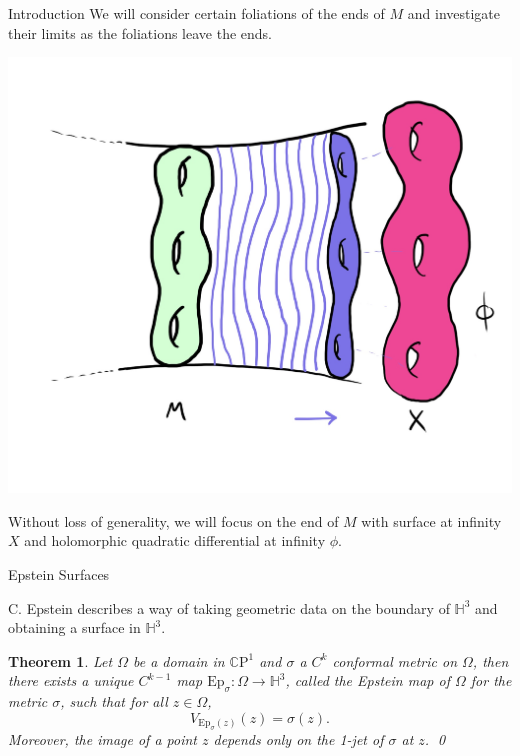 \documentclass[professionalfont]{beamer}
\newcommand{\CP}{\mathbb{C}\mathrm{P}}
\renewcommand{\H}{\mathbb{H}}
\newtheorem{thm}{Theorem}[section]
\begin{document}
\begin{frame}{Introduction}
We will consider certain foliations of the ends of $M$ and investigate their limits as the foliations leave the ends. 

\begin{center}
\includegraphics[scale=0.09]{Foliation.jpg}
\end{center}

Without loss of generality, we will focus on the end of $M$ with surface at infinity $X$ and holomorphic quadratic differential at infinity $\phi$.


\end{frame}




\begin{frame}{Epstein Surfaces}

C. Epstein describes a way of taking geometric data on the boundary of $\H^3$ and obtaining a surface in $\H^3$.
\newline

\begin{thm}
Let $\Omega$ be a domain in $\CP^1$  and $\sigma$ a $C^k$ conformal metric on $\Omega$, then there exists a unique $C^{k-1}$ map $\mathrm{Ep}_\sigma : \Omega \to \H^3$, called the Epstein map of $\Omega$ for the metric $\sigma$, such that for all $z \in \Omega$,
\[
V_{\mathrm{Ep}_\sigma(z)}(z) = \sigma(z).
\]
Moreover, the image of a point $z$ depends only on the 1-jet of $\sigma$ at $z$.
\label{epstein-map-def} \qed
\end{thm}



\end{frame}
\end{document}
